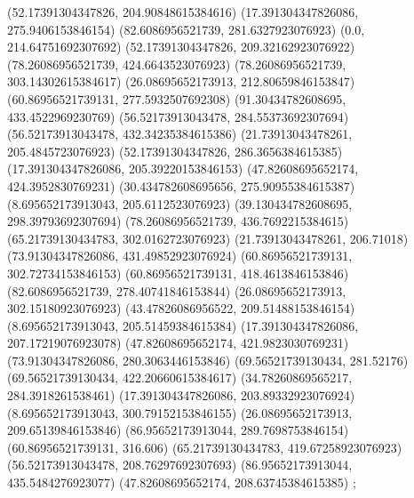 {{{		(52.17391304347826, 204.90848615384616)
		(17.391304347826086, 275.9406153846154)
		(82.6086956521739, 281.6327923076923)
		(0.0, 214.64751692307692)
		(52.17391304347826, 209.32162923076922)
		(78.26086956521739, 424.6643523076923)
		(78.26086956521739, 303.14302615384617)
		(26.08695652173913, 212.80659846153847)
		(60.86956521739131, 277.5932507692308)
		(91.30434782608695, 433.4522969230769)
		(56.52173913043478, 284.55373692307694)
		(56.52173913043478, 432.34235384615386)
		(21.73913043478261, 205.4845723076923)
		(52.17391304347826, 286.3656384615385)
		(17.391304347826086, 205.39220153846153)
		(47.82608695652174, 424.3952830769231)
		(30.434782608695656, 275.90955384615387)
		(8.695652173913043, 205.6112523076923)
		(39.130434782608695, 298.39793692307694)
		(78.26086956521739, 436.7692215384615)
		(65.21739130434783, 302.0162723076923)
		(21.73913043478261, 206.71018)
		(73.91304347826086, 431.49852923076924)
		(60.86956521739131, 302.72734153846153)
		(60.86956521739131, 418.4613846153846)
		(82.6086956521739, 278.40741846153844)
		(26.08695652173913, 302.15180923076923)
		(43.47826086956522, 209.51488153846154)
		(8.695652173913043, 205.51459384615384)
		(17.391304347826086, 207.17219076923078)
		(47.82608695652174, 421.9823030769231)
		(73.91304347826086, 280.3063446153846)
		(69.56521739130434, 281.52176)
		(69.56521739130434, 422.20660615384617)
		(34.78260869565217, 284.3918261538461)
		(17.391304347826086, 203.89332923076924)
		(8.695652173913043, 300.79152153846155)
		(26.08695652173913, 209.65139846153846)
		(86.95652173913044, 289.7698753846154)
		(60.86956521739131, 316.606)
		(65.21739130434783, 419.67258923076923)
		(56.52173913043478, 208.76297692307693)
		(86.95652173913044, 435.5484276923077)
		(47.82608695652174, 208.63745384615385)
	};

}}
